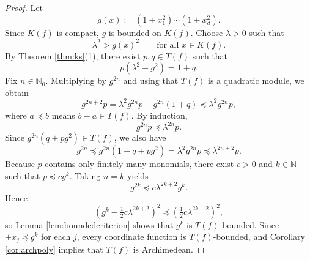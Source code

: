\documentclass[10pt,a4paper]{amsart}
\newcommand{\N}{\mathbb{N}}
\begin{document}
\begin{proof}
Let
\[
g(x):=(1+x_1^2)\cdots(1+x_d^2).
\]
Since \(K(f)\) is compact, \(g\) is bounded on \(K(f)\). Choose \(\lambda>0\) such that
\[
\lambda^2>g(x)^2 \qquad \text{for all } x\in K(f).
\]
By Theorem \ref{thm:ks}\textup{(1)}, there exist \(p,q\in T(f)\) such that
\[
p(\lambda^2-g^2)=1+q.
\]
Fix \(n\in\N_0\). Multiplying by \(g^{2n}\) and using that \(T(f)\) is a quadratic module, we obtain
\[
g^{2n+2}p=\lambda^2g^{2n}p-g^{2n}(1+q)\preceq \lambda^2g^{2n}p,
\]
where \(a\preceq b\) means \(b-a\in T(f)\). By induction,
\[
g^{2n}p\preceq \lambda^{2n}p.
\]
Since \(g^{2n}(q+pg^2)\in T(f)\), we also have
\[
g^{2n}\preceq g^{2n}(1+q+pg^2)=\lambda^2g^{2n}p\preceq \lambda^{2n+2}p.
\]
Because \(p\) contains only finitely many monomials, there exist \(c>0\) and \(k\in\N\) such that \(p\preceq c g^k\). Taking \(n=k\) yields
\[
g^{2k}\preceq c\lambda^{2k+2}g^k.
\]
Hence
\[
\left(g^k-\tfrac12 c\lambda^{2k+2}\right)^2\preceq \left(\tfrac12 c\lambda^{2k+2}\right)^2,
\]
so Lemma \ref{lem:boundedcriterion} shows that \(g^k\) is \(T(f)\)-bounded. Since \(\pm x_j\preceq g^k\) for each \(j\), every coordinate function is \(T(f)\)-bounded, and Corollary \ref{cor:archpoly} implies that \(T(f)\) is Archimedean.
\end{proof}
\end{document}
